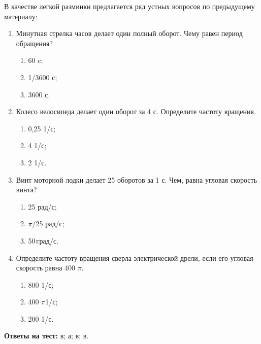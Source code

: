 В качестве легкой разминки предлагается ряд устных вопросов по предыдущему материалу:

\begin{enumerate}
	\item Минутная стрелка часов делает один полный оборот. Чему равен период обращения?
	\begin{enumerate}
		\item 60 c;
		\item 1/3600 с;
		\item 3600 с.
	\end{enumerate}
	\item Колесо велосипеда делает один оборот за 4 с. Определите частоту вращения.
	\begin{enumerate}
		\item 0,25 1/с;
		\item 4 1/с;
		\item 2 1/с.
	\end{enumerate}
	\item  Винт моторной лодки делает 25 оборотов за 1 с. Чем, равна угловая скорость винта?
	\begin{enumerate}
		\item 25 рад/с;
		\item  \(\pi\)/25 рад/с;
		\item 50\(\pi\)рад/с.
	\end{enumerate}
	\item Определите частоту вращения сверла электрической дрели, если его угловая скорость равна 400 \(\pi\).
	\begin{enumerate}
		\item 800 1/с;
		\item 400 \(\pi\)1/с;
		\item 200 1/с.
	\end{enumerate} 
\end{enumerate}

{\bfseries Ответы  на тест:} в; а; в; в.
\clearpage
{\hypertarget{lesson6x3}{}}\\\\

